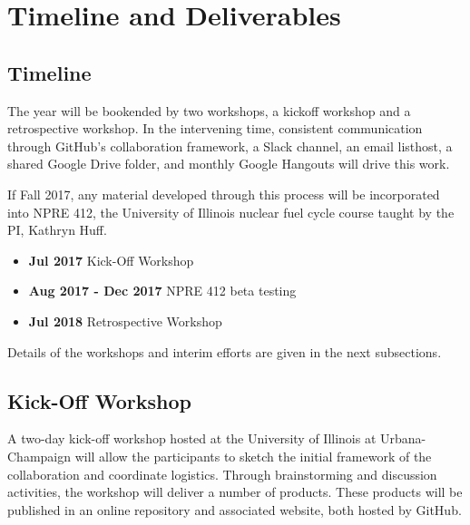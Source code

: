 \documentclass[11pt]{article}
\begin{document}

          \section{Timeline and Deliverables}
          \subsection{Timeline}
          The year will be bookended by two workshops, a kickoff workshop 
          and a retrospective workshop. In the intervening time, consistent 
          communication through GitHub's collaboration framework, a Slack 
          channel, an email listhost, a shared Google Drive folder, and monthly 
          Google Hangouts will drive this work.

          If Fall 2017, any material developed through this process will be 
          incorporated into NPRE 412, the University of Illinois nuclear fuel 
          cycle course taught by the PI, Kathryn Huff.  

          \begin{itemize}
                  \item \textbf{Jul 2017} Kick-Off Workshop
                  \item \textbf{Aug 2017 - Dec 2017} NPRE 412 beta testing
                  \item \textbf{Jul 2018} Retrospective Workshop
          \end{itemize}

          Details of the workshops and interim efforts are given in the next 
          subsections.

          \subsection{Kick-Off Workshop}
          A two-day kick-off workshop hosted at the University of Illinois at 
          Urbana-Champaign will allow the 
          participants to sketch the initial framework of 
          the collaboration and coordinate logistics. Through brainstorming and 
          discussion activities, the workshop will deliver a number of 
          products. These products will be published in an online repository 
          and associated website, both hosted by GitHub. 
\end{document}
